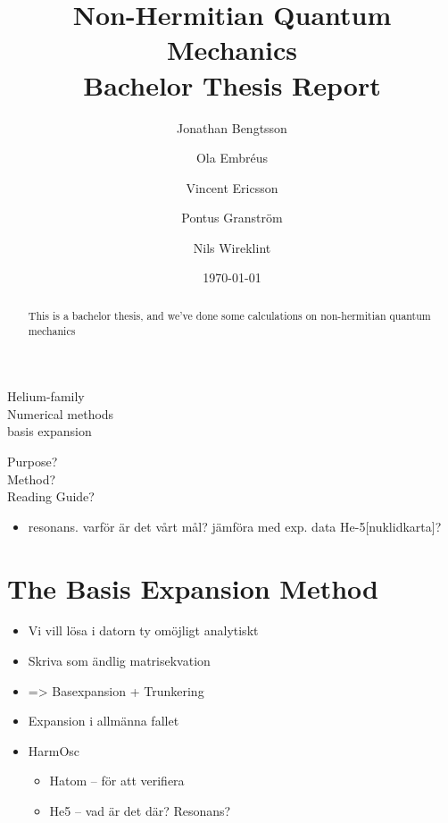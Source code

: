 \documentclass[12pt,a4paper]{report}
\begin{document}
  


\title{Non-Hermitian Quantum Mechanics\\
\Large Bachelor Thesis Report}
\author{Jonathan Bengtsson  \and Ola Embréus \and Vincent Ericsson \and Pontus Granström \and Nils Wireklint}
\date{\today}



\maketitle

\newpage
\begin{abstract}
This is a bachelor thesis, and we've done some calculations on non-hermitian quantum mechanics 
\end{abstract}
\newpage

\tableofcontents

\newpage


{\Large Helium-family \\ Numerical methods\\ basis expansion}

{\Large Purpose? \\ Method? \\ Reading Guide?}

\begin{itemize}
  \item resonans. varför är det vårt mål? jämföra med exp. data He-5[nuklidkarta]?
\end{itemize}



\chapter{The Basis Expansion Method} %
\label{cha:the_basis_expansion_method}

\begin{itemize}
  \item Vi vill lösa i datorn ty omöjligt analytiskt
  \item Skriva som ändlig matrisekvation
  \item => Basexpansion + Trunkering
  \item Expansion i allmänna fallet
  \item HarmOsc
  \begin{itemize}
    \item Hatom – för att verifiera
    \item He5 – vad är det där? Resonans?
  \end{itemize}
\end{itemize}
\end{document}
